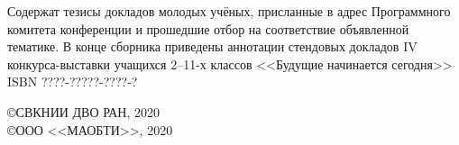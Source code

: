 \vfill
\vfill
Содержат тезисы докладов молодых учёных, присланные в адрес Программного комитета конференции и прошедшие отбор на соответствие объявленной тематике. В конце сборника приведены аннотации стендовых докладов IV конкурса-выставки учащихся 2--11-х классов <<Будущие начинается сегодня>>
\vfill
  \bigskip
\noindent ISBN ????-?????-????-?
\hfill \begin{minipage}[t][3cm][t]{0.38\textwidth}
\copyright СВКНИИ ДВО РАН, 2020 \\
\copyright ООО <<МАОБТИ>>, 2020
\end{minipage}

